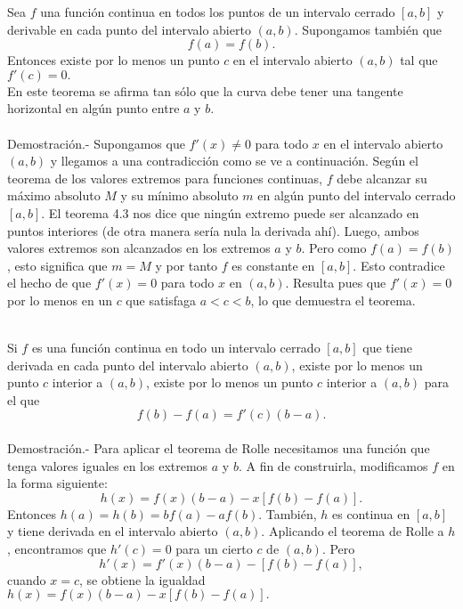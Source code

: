 \begin{teo}
    Sea $f$ una función continua en todos los puntos de un intervalo cerrado $[a,b]$ y derivable en cada punto del intervalo abierto $(a,b)$. Supongamos también que 
    $$f(a)=f(b).$$
    Entonces existe por lo menos un punto $c$ en el intervalo abierto $(a,b)$ tal que $f'(c)=0.$\\

    En este teorema se afirma tan sólo que la curva debe tener una tangente horizontal en algún punto entre $a$ y $b$.\\\\
	Demostración.-\; Supongamos que $f'(x)\neq 0$ para todo $x$ en el intervalo abierto $(a,b)$ y llegamos a una contradicción como se ve a continuación. Según el teorema de los valores extremos para funciones continuas, $f$ debe alcanzar su máximo absoluto $M$ y su mínimo absoluto $m$ en algún punto del intervalo cerrado $[a,b]$. El teorema 4.3 nos dice que ningún extremo puede ser alcanzado en puntos interiores (de otra manera sería nula la derivada ahí). Luego, ambos valores extremos son alcanzados en los extremos $a$ y $b$. Pero como $f(a)=f(b)$, esto significa que $m=M$ y por tanto $f$ es constante en $[a,b]$. Esto contradice el hecho de que $f'(x)=0$ para todo $x$ en $(a,b)$. Resulta pues que $f'(x)=0$ por lo menos en un $c$ que satisfaga $a<c<b$, lo que demuestra el teorema.\\\\
\end{teo}

\begin{teo}
    Si $f$ es una función continua en todo un intervalo cerrado $[a,b]$ que tiene derivada en cada punto del intervalo abierto $(a,b)$, existe por lo menos un punto $c$ interior a $(a,b)$, existe por lo menos un punto $c$ interior a $(a,b)$ para el que 
    $$f(b)-f(a)=f'(c)(b-a).$$\\
	Demostración.-\; Para aplicar el teorema de Rolle necesitamos una función que tenga valores iguales en los extremos $a$ y $b$. A fin de construirla, modificamos $f$ en la forma siguiente:
	$$h(x)=f(x)(b-a)-x[f(b)-f(a)].$$
	Entonces $h(a)=h(b)=bf(a)-af(b)$. También, $h$ es continua en $[a,b]$ y tiene derivada en el intervalo abierto $(a,b)$. Aplicando el teorema de Rolle a $h$, encontramos que $h'(c)=0$ para un cierto $c$ de $(a,b)$. Pero
	$$h'(x)=f'(x)(b-a)-[f(b)-f(a)],$$
	cuando $x=c$, se obtiene la igualdad $h(x)=f(x)(b-a)-x[f(b)-f(a)].$\\
\end{teo}

